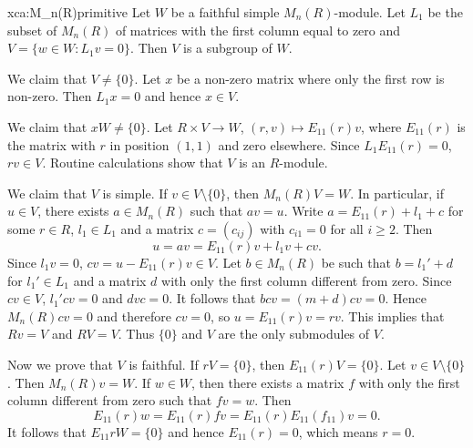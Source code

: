     

\begin{sol}{xca:M_n(R)primitive}
    Let $W$ be a faithful simple $M_n(R)$-module. Let 
    $L_1$ be the subset of $M_n(R)$ of matrices 
    with the first column equal to zero and 
    $V=\{w\in W:L_1v=0\}$. Then $V$ is a subgroup of $W$. 

    We claim that $V\ne\{0\}$. Let $x$ be 
    a non-zero matrix where only the first row is non-zero. Then 
    $L_1x=0$ and hence $x\in V$. 

    We claim that $xW\ne\{0\}$. 
    Let $R\times V\to W$, $(r,v)\mapsto E_{11}(r)v$, where $E_{11}(r)$ is the matrix 
    with $r$ in position $(1,1)$ and zero elsewhere. Since 
    $L_1E_{11}(r)=0$, $rv\in V$. Routine calculations show
    that $V$ is an $R$-module. 
    
    We claim that $V$ is simple. 
    If $v\in V\setminus\{0\}$, then 
    $M_n(R)V=W$. In particular, if $u\in V$, 
    there exists $a\in M_n(R)$ 
    such that $av=u$. Write $a=E_{11}(r)+l_1+c$ for
    some $r\in R$, $l_1\in L_1$ and a matrix 
    $c=(c_{ij})$ with $c_{i1}=0$ for all $i\geq2$. Then
    \[
    u=av=E_{11}(r)v+l_1v+cv.
    \]
    Since $l_1v=0$, $cv=u-E_{11}(r)v\in V$. Let $b\in M_n(R)$ 
    be such that $b=l_1'+d$ for $l_1'\in L_1$ and a matrix $d$
    with only the first column different from zero. Since $cv\in V$, 
    $l_1'cv=0$ and $dvc=0$. It follows that
    $bcv=(m+d)cv=0$. Hence $M_n(R)cv=0$ and 
    therefore $cv=0$, so $u=E_{11}(r)v=rv$. This implies that 
    $Rv=V$ and $RV=V$. Thus $\{0\}$ and $V$ are the only 
    submodules of $V$. 

    Now we prove that $V$ is faithful. If $rV=\{0\}$, then
    $E_{11}(r)V=\{0\}$. Let $v\in V\setminus\{0\}$. Then
    $M_n(R)v=W$. If $w\in W$, then there exists 
    a matrix $f$ with only the first column different from zero
    such that $fv=w$. Then
    \[
    E_{11}(r)w=E_{11}(r)fv=E_{11}(r)E_{11}(f_{11})v=0.
    \]
    It follows that $E_{11}rW=\{0\}$ and
    hence $E_{11}(r)=0$, which means $r=0$.
\end{sol}
%

